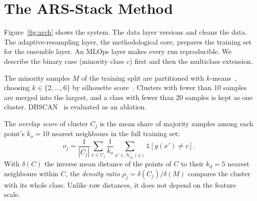 \section{The ARS-Stack Method}\label{sec:method}

Figure~\ref{fig:arch} shows the system. The data layer versions and cleans the data. The adaptive-resampling layer,
the methodological core, prepares the training set for the ensemble layer. An MLOps layer makes every run
reproducible. We describe the binary case (minority class $c$) first and then the multiclass extension.

\begin{widefigure}
  \centering
  \resizebox{\linewidth}{!}{}
  \caption{\ars{} architecture. The minority class is clustered, each cluster is scored and resampled with its own
  resampler under a global synthetic-sample budget, and three tree ensembles are combined with confidence weights and
  a validation-tuned threshold. An MLOps layer handles versioning, tracking, orchestration, containers and serving.}
  \label{fig:arch}
\end{widefigure}

The minority samples $M$ of the training split are partitioned with $k$-means~\cite{macqueen1967some}, choosing
$k\in\{2,\dots,6\}$ by silhouette score~\cite{rousseeuw1987silhouettes}. Clusters with fewer than 10 samples are
merged into the largest, and a class with fewer than 20 samples is kept as one cluster.
DBSCAN~\cite{ester1996density} is evaluated as an ablation.

The \emph{overlap score} of cluster $C_j$ is the mean share of majority samples among each point's $k_o=10$ nearest
neighbours in the full training set:
\begin{equation}
  o_j = \frac{1}{|C_j|}\sum_{x\in C_j}\frac{1}{k_o}\sum_{x'\in \mathcal{N}_{k_o}(x)} \mathbb{1}\left[y(x')\neq c\right].
  \label{eq:overlap}
\end{equation}
With $\delta(C)$ the inverse mean distance of the points of $C$ to their $k_d=5$ nearest neighbours within $C$, the
\emph{density ratio} $\rho_j=\delta(C_j)/\delta(M)$ compares the cluster with its whole class. Unlike raw distances,
it does not depend on the feature scale.

